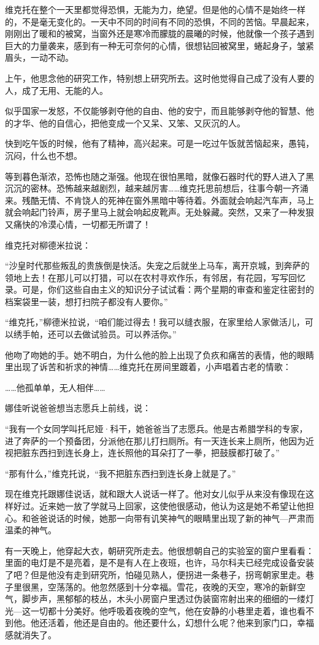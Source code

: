 维克托在整个一天里都觉得恐惧，无能为力，绝望。但是他的心情不是始终一样的，不是毫无变化的。一天中不同的时间有不同的恐惧，不同的苦恼。早晨起来，刚刚出了暖和的被窝，当窗外还是寒冷而朦胧的晨曦的时候，他就像一个孩子遇到巨大的力量袭来，感到有一种无可奈何的心情，很想钻回被窝里，蜷起身子，皱紧眉头，一动不动。

上午，他思念他的研究工作，特别想上研究所去。这时他觉得自己成了没有人要的人，成了无用、无能的人。

似乎国家一发怒，不仅能够剥夺他的自由、他的安宁，而且能够剥夺他的智慧、他的才华、他的自信心，把他变成一个又呆、又笨、又灰沉的人。

快到吃午饭的时候，他有了精神，高兴起来。可是一吃过午饭就苦恼起来，愚钝，沉闷，什么也不想。

等到暮色渐浓，恐怖也随之渐强。他现在很怕黑暗，就像石器时代的野人进入了黑沉沉的密林。恐怖越来越剧烈，越来越厉害……维克托思前想后，往事今朝一齐涌来。残酷无情、不肯饶人的死神在窗外黑暗中等待着。外面就会响起汽车声，马上就会响起门铃声，房子里马上就会响起皮靴声。无处躲藏。突然，又来了一种发狠又痛快的冷漠心情，一切都无所谓了！

维克托对柳德米拉说：

“沙皇时代那些叛乱的贵族倒是快活。失宠之后就坐上马车，离开京城，到奔萨的领地上去！在那儿可以打猎，可以在农村寻欢作乐，有邻居，有花园，写写回忆录。可是，你们这些自由主义的知识分子试试看：两个星期的审查和鉴定往密封的档案袋里一装，想打扫院子都没有人要你。”

“维克托，”柳德米拉说，“咱们能过得去！我可以缝衣服，在家里给人家做活儿，可以绣手帕，还可以去做试验员。可以养活你。”

他吻了吻她的手。她不明白，为什么他的脸上出现了负疚和痛苦的表情，他的眼睛里出现了诉苦和祈求的神情……维克托在房间里踱着，小声唱着古老的情歌：

……他孤单单，无人相伴……

娜佳听说爸爸想当志愿兵上前线，说：

“我有一个女同学叫托尼娅·科干，她爸爸当了志愿兵。他是古希腊学科的专家，进了奔萨的一个预备团，分派他在那儿打扫厕所。有一天连长来上厕所，他因为近视把脏东西扫到连长身上，连长照他的耳朵打了一拳，把鼓膜都打破了。”

“那有什么，”维克托说，“我不把脏东西扫到连长身上就是了。”

现在维克托跟娜佳说话，就和跟大人说话一样了。他对女儿似乎从来没有像现在这样好过。近来她一放了学就马上回家，这使他很感动，他认为这是她不希望让他担心。和爸爸说话的时候，她那一向带有讥笑神气的眼睛里出现了新的神气—严肃而温柔的神气。

有一天晚上，他穿起大衣，朝研究所走去。他很想朝自己的实验室的窗户里看看：里面的电灯是不是亮着，是不是有人在上夜班，也许，马尔科夫已经完成设备安装了吧？但是他没有走到研究所，怕碰见熟人，便拐进一条巷子，拐弯朝家里走。巷子里很黑，空荡荡的。他忽然感到十分幸福。雪花，夜晚的天空，寒冷的新鲜空气，脚步声，黑郁郁的枝丛，木头小房窗户里透过伪装窗帘射出来的细细的一缕灯光—这一切都十分美好。他呼吸着夜晚的空气，他在安静的小巷里走着，谁也看不到他。他还活着，他还是自由的。他还要什么，幻想什么呢？他来到家门口，幸福感就消失了。

